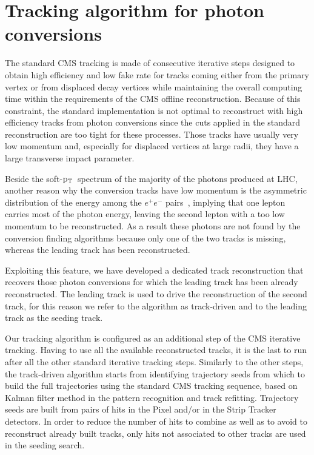 \documentclass[a4paper]{jpconf}
\def \pt{$\p_{\rm T}$~}
\begin{document}

\section{Tracking algorithm for photon conversions}
\label{sec:newSeedingStep}
 

The standard CMS tracking is made of consecutive iterative steps designed to obtain high efficiency and low fake rate for
tracks coming either from the primary vertex or from displaced decay
vertices while maintaining the overall computing time within the
requirements of the CMS offline reconstruction.
Because of this constraint, the standard implementation is not optimal
to reconstruct with high efficiency tracks from photon conversions
since the cuts applied in the standard
reconstruction are too tight for these processes. Those
tracks have usually very low momentum and, especially for displaced
vertices at large radii, they have a large transverse impact parameter.

Beside the soft-\pt spectrum of the majority of the photons produced at LHC, another reason why the conversion tracks have low momentum is the asymmetric distribution of the energy among the $e^+e^-$ pairs~\cite{pdg}, implying that one lepton carries most of the photon energy, leaving the second lepton with a too low momentum to be reconstructed. As a result these photons are not found by the conversion finding algorithms because only one of the two tracks is missing, whereas the leading track has been reconstructed.

Exploiting this feature, we have developed a dedicated track reconstruction that recovers those photon conversions for which the 
leading  track has been already reconstructed. The leading track is used to drive the reconstruction of the second track, for this reason we refer to the algorithm as track-driven and to the leading track as the seeding track.

Our tracking algorithm is configured as an additional step of the CMS iterative tracking. Having to use all the available reconstructed tracks, it is the last to run after all the other standard iterative tracking steps.
%
Similarly to  the other steps, the track-driven algorithm starts from identifying trajectory seeds from which to build the full trajectories using the standard CMS tracking sequence, based on Kalman filter method in the pattern recognition and track refitting.
Trajectory seeds are built from pairs of hits
in the Pixel and/or in the Strip Tracker detectors. 
In order to reduce the number of hits to combine as well as to avoid to reconstruct already built tracks,  only hits not associated to other tracks are used in the seeding search.
\end{document}
